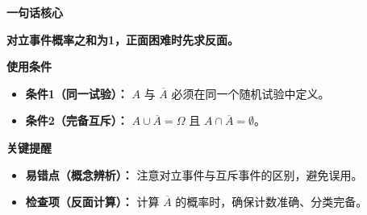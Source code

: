 \begin{summarybox}
	\textbf{\textcolor{CSummary}{一句话核心}}

	\textbf{对立事件概率之和为1，正面困难时先求反面。}

	\medskip
	\textbf{\textcolor{CSummary}{使用条件}}
	\begin{itemize}[leftmargin=*, itemsep=0.5em, topsep=0.4em]
		\item \textbf{条件1（同一试验）：} $A$ 与 $\overline{A}$ 必须在同一个随机试验中定义。
		\item \textbf{条件2（完备互斥）：} $A\cup\overline{A}=\Omega$ 且 $A\cap\overline{A}=\emptyset$。
	\end{itemize}

	\medskip
	\textbf{\textcolor{CSummary}{关键提醒}}
	\begin{itemize}[leftmargin=*, itemsep=0.5em, topsep=0.4em]
		\item \textbf{易错点（概念辨析）：} 注意对立事件与互斥事件的区别，避免误用。
		\item \textbf{检查项（反面计算）：} 计算 $\overline{A}$ 的概率时，确保计数准确、分类完备。
	\end{itemize}
\end{summarybox}
